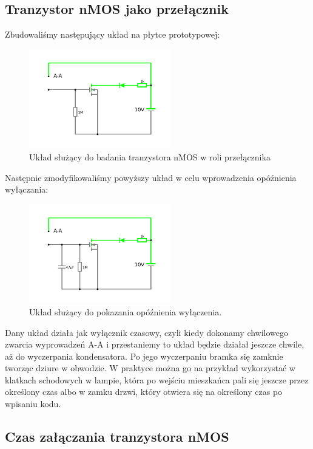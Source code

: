 \documentclass[polish,polish,a4paper]{article}
\begin{document}
\subsection{Tranzystor nMOS jako przełącznik}

Zbudowaliśmy następujący układ na płytce prototypowej:
\begin{figure}[H]
\centering
\includegraphics[width=0.55\textwidth]{nmos przelacznik.pdf}
\caption{Układ służący do badania tranzystora nMOS w roli przełącznika}
\end{figure}

Następnie zmodyfikowaliśmy powyższy układ w celu wprowadzenia opóźnienia wyłączania:
\begin{figure}[H]
\centering
\includegraphics[width=0.55\textwidth]{nmos przelacznik opoznienie.pdf}
\caption{Układ służący do pokazania opóźnienia wyłączenia.}
\end{figure}

Dany układ działa jak wyłącznik czasowy, czyli kiedy dokonamy chwilowego zwarcia wyprowadzeń A-A i przestaniemy to układ będzie działał jeszcze chwile, aż do wyczerpania kondensatora. Po jego wyczerpaniu bramka się zamknie tworząc dziure w obwodzie. W praktyce można go na przykład wykorzystać w klatkach schodowych w lampie, która po wejściu mieszkańca pali się jeszcze przez określony czas albo w zamku drzwi, który otwiera się na określony czas po wpisaniu kodu.

\subsection{Czas załączania tranzystora nMOS}
\end{document}

